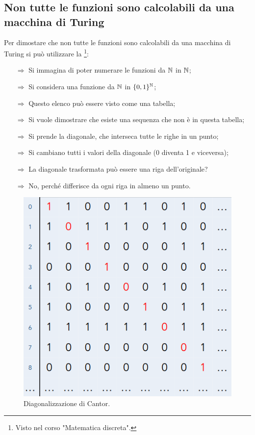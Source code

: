 

\subsection{Non tutte le funzioni sono calcolabili da una macchina di Turing}

Per dimostare che non tutte le funzioni sono calcolabili da una macchina di Turing  si può
utilizzare la \footnote{Visto nel corso "Matematica discreta".}:
\begin{itemize}
    \item [$\Rightarrow$] Si immagina di poter numerare le funzioni da $\mathbb{N}$ in $\mathbb{N}$;
    \item [$\Rightarrow$] Si considera una funzione da $\mathbb{N}$ in $\{0,1\}^{\mathbb{N}}$;
    \item [$\Rightarrow$] Questo elenco può essere visto come una tabella;
    \item [$\Rightarrow$] Si vuole dimostrare che esiste una sequenza che non è in questa tabella;
    \item [$\Rightarrow$] Si prende la diagonale, che interseca tutte le righe in un punto;
    \item [$\Rightarrow$] Si cambiano tutti i valori della diagonale (0 diventa 1 e viceversa);
    \item [$\Rightarrow$] La diagonale trasformata può essere una riga dell'originale?
    \item [$\Rightarrow$] No, perché differisce da ogni riga in almeno un punto.
\end{itemize}

\begin{figure}[h]
    \centering
    \includegraphics[scale = 0.38]{images/Diagonalizzazione.png}
    \caption{Diagonalizzazione di Cantor.}
\end{figure}

